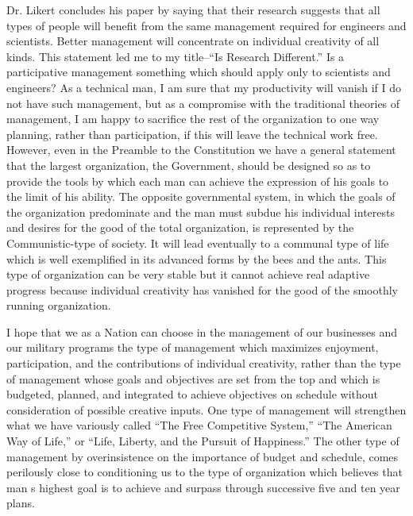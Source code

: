 \documentclass{article}
\begin{document}
Dr. Likert concludes his paper by saying that their research suggests that all types of people will benefit from the same management required for engineers and scientists. Better management will concentrate on individual creativity of all kinds. This statement led me to my title--``Is Research Different.'' Is a participative management something which should apply only to scientists and engineers? As a technical man, I am sure that my productivity will vanish if I do not have such management, but as a compromise with the traditional theories of management, I am happy to sacrifice the rest of the organization to one way planning, rather than participation, if this will leave the technical work free. However, even in the Preamble to the Constitution we have a general statement that the largest organization, the Government, should be designed so as to provide the tools by which each man can achieve the expression of his goals to the limit of his ability. The opposite governmental system, in which the goals of the organization predominate and the man must subdue his individual interests and desires for the good of the total organization, is represented by the Communistic-type of society. It will lead eventually to a communal type of life which is well exemplified in its advanced forms by the bees and the ants. This type of organization can be very stable but it cannot achieve real adaptive progress because individual creativity has vanished for the good of the smoothly running organization.

I hope that we as a Nation can choose in the management of our businesses and our military programs the type of management which maximizes enjoyment, participation, and the contributions of individual creativity, rather than the type of management whose goals and objectives are set from the top and which is budgeted, planned, and integrated to achieve objectives on schedule without consideration of possible creative inputs. One type of management will strengthen what we have variously called ``The Free Competitive System,'' ``The American Way of Life,'' or ``Life, Liberty, and the Pursuit of Happiness.'' The other type of management by overinsistence on the importance of budget and schedule, comes perilously close to conditioning us to the type of organization which believes that man s highest goal is to achieve and surpass through successive five and ten year plans.

\printbibliography
\end{document}
